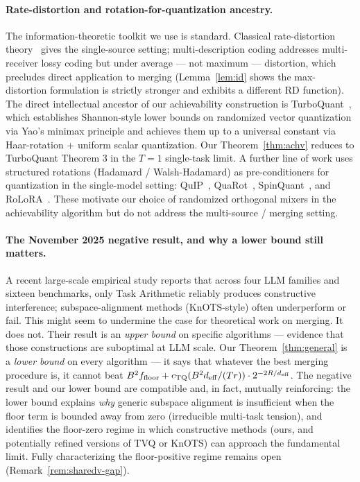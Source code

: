 \paragraph{Rate-distortion and rotation-for-quantization ancestry.}
The information-theoretic toolkit we use is standard. Classical
rate-distortion theory~\cite{shannon1959rd,coverthomas} gives
the single-source setting; multi-description coding
\cite{elgamalcover1982md} addresses multi-receiver lossy coding
but under average — not maximum — distortion, which precludes
direct application to merging (Lemma~\ref{lem:id} shows the
max-distortion formulation is strictly stronger and exhibits a
different RD function). The direct intellectual ancestor of our
achievability construction is
TurboQuant~\cite{zandieh2025turboquant}, which establishes
Shannon-style lower bounds on randomized vector quantization via
Yao's minimax principle and achieves them up to a universal
constant via Haar-rotation + uniform scalar quantization. Our
Theorem~\ref{thm:achv} reduces to TurboQuant Theorem 3 in the
$T=1$ single-task limit. A further line of work uses structured
rotations (Hadamard / Walsh-Hadamard) as pre-conditioners for
quantization in the single-model setting:
QuIP~\cite{tseng2024quip}, QuaRot~\cite{ashkboos2024quarot},
SpinQuant~\cite{liu2025spinquant}, and
RoLoRA~\cite{xi2024rolora}. These motivate our choice of
randomized orthogonal mixers in the achievability algorithm but
do not address the multi-source / merging setting.

\paragraph{The November 2025 negative result, and why a lower
bound still matters.} A recent large-scale empirical study
\cite{systematic2025merging} reports that across four LLM
families and sixteen benchmarks, only Task Arithmetic reliably
produces constructive interference; subspace-alignment methods
(KnOTS-style) often underperform or fail. This might seem to
undermine the case for theoretical work on merging. It does not.
Their result is an \emph{upper bound} on specific algorithms —
evidence that those constructions are suboptimal at LLM scale.
Our Theorem~\ref{thm:general} is a \emph{lower bound} on every
algorithm — it says that whatever the best merging procedure is,
it cannot beat $B^2 f_{\mathrm{floor}} + c_{\mathrm{TQ}}
(B^2 d_{\mathrm{eff}} / (Tr)) \cdot 2^{-2R/d_{\mathrm{eff}}}$. The negative result and
our lower bound are compatible and, in fact, mutually
reinforcing: the lower bound explains \emph{why} generic
subspace alignment is insufficient when the floor term is
bounded away from zero (irreducible multi-task tension), and
identifies the floor-zero regime in which constructive methods
(ours, and potentially refined versions of TVQ or KnOTS) can
approach the fundamental limit. Fully characterizing the
floor-positive regime remains open
(Remark~\ref{rem:sharedv-gap}).
